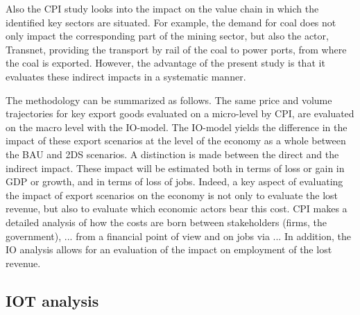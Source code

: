 \documentclass[12pt,english]{article}
\begin{document}
Also the CPI study looks into the impact on the value chain in which the identified key sectors are situated. For example, the demand for coal does not only impact the corresponding part of the mining sector, but also the actor, Transnet, providing the transport by rail of the coal to power ports, from where the coal is exported. However, the advantage of the present study is that it evaluates these indirect impacts in a systematic manner.

The methodology can be summarized as follows. The same price and volume trajectories for key export goods %
evaluated on a micro-level by CPI, are evaluated on the macro level with the IO-model. The IO-model yields the difference in the impact of these export scenarios at the level of the economy as a whole between the BAU and 2DS scenarios. A distinction is made between the direct and the indirect impact. %
These impact will be estimated both in terms of loss or gain in GDP or growth, and in terms of loss of jobs. Indeed, a key aspect of evaluating the impact of export scenarios on the economy is not only to evaluate the lost revenue, but also to evaluate which economic actors bear this cost. CPI makes a detailed analysis of how the costs are born between stakeholders (firms, the government), ... from a financial point of view and on jobs via ... In addition, the IO analysis allows for an evaluation of the impact on employment of the lost revenue. 





\subsection{IOT analysis}
\end{document}
